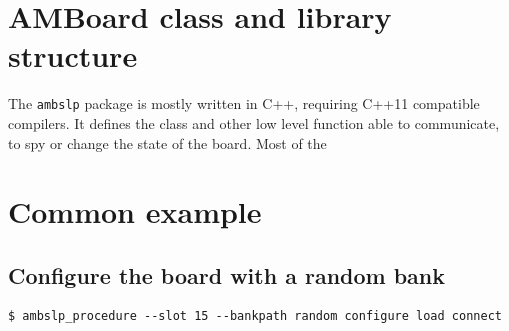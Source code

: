 \documentclass[UKenglish]{latex/atlasdoc}
\begin{document}


\section{AMBoard class and library structure}
\label{sec:library}

The \texttt{ambslp} package is mostly written in C++, requiring C++11 
compatible compilers. It defines the \textbf{\AMBoard} class and other low
level function able to communicate, to spy or change the state of the board.
Most of the 


\appendix
\section{Common example}
\subsection{Configure the board with a random bank}

\begin{verbatim}
$ ambslp_procedure --slot 15 --bankpath random configure load connect
\end{verbatim}
\end{document}
